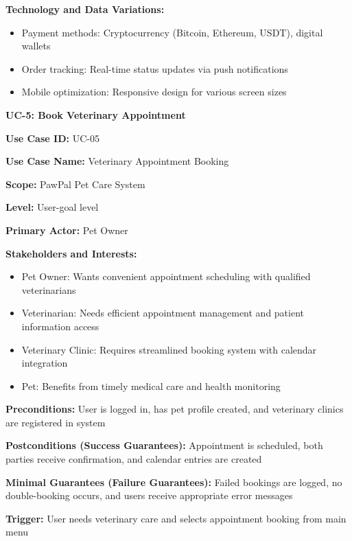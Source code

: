 \textbf{Technology and Data Variations:}
\begin{itemize}
    \item Payment methods: Cryptocurrency (Bitcoin, Ethereum, USDT), digital wallets
    \item Order tracking: Real-time status updates via push notifications

    \item Mobile optimization: Responsive design for various screen sizes
\end{itemize}

\textbf{UC-5: Book Veterinary Appointment}

\textbf{Use Case ID:} UC-05

\textbf{Use Case Name:} Veterinary Appointment Booking

\textbf{Scope:} PawPal Pet Care System

\textbf{Level:} User-goal level

\textbf{Primary Actor:} Pet Owner

\textbf{Stakeholders and Interests:}
\begin{itemize}
    \item Pet Owner: Wants convenient appointment scheduling with qualified veterinarians
    \item Veterinarian: Needs efficient appointment management and patient information access
    \item Veterinary Clinic: Requires streamlined booking system with calendar integration
    \item Pet: Benefits from timely medical care and health monitoring
\end{itemize}

\textbf{Preconditions:} User is logged in, has pet profile created, and veterinary clinics are registered in system

\textbf{Postconditions (Success Guarantees):} Appointment is scheduled, both parties receive confirmation, and calendar entries are created

\textbf{Minimal Guarantees (Failure Guarantees):} Failed bookings are logged, no double-booking occurs, and users receive appropriate error messages

\textbf{Trigger:} User needs veterinary care and selects appointment booking from main menu

